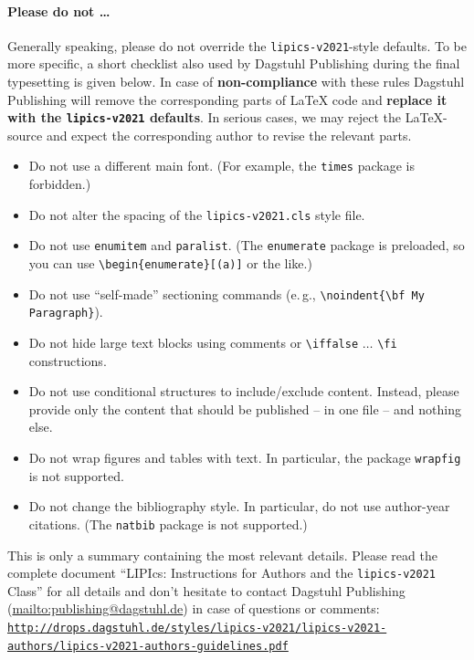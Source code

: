 \paragraph*{Please do not \ldots} %
Generally speaking, please do not override the \texttt{lipics-v2021}-style defaults. To be more specific, a short checklist also used by Dagstuhl Publishing during the final typesetting is given below.
In case of \textbf{non-compliance} with these rules Dagstuhl Publishing will remove the corresponding parts of \LaTeX{} code and \textbf{replace it with the \texttt{lipics-v2021} defaults}. In serious cases, we may reject the LaTeX-source and expect the corresponding author to revise the relevant parts.
\begin{itemize}
\item Do not use a different main font. (For example, the \texttt{times} package is forbidden.)
\item Do not alter the spacing of the \texttt{lipics-v2021.cls} style file.
\item Do not use \verb+enumitem+ and \verb+paralist+. (The \texttt{enumerate} package is preloaded, so you can use
 \verb+\begin{enumerate}[(a)]+ or the like.)
\item Do not use ``self-made'' sectioning commands (e.\,g., \verb+\noindent{\bf My+ \verb+Paragraph}+).
\item Do not hide large text blocks using comments or \verb+\iffalse+ $\ldots$ \verb+\fi+ constructions. 
\item Do not use conditional structures to include/exclude content. Instead, please provide only the content that should be published -- in one file -- and nothing else.
\item Do not wrap figures and tables with text. In particular, the package \texttt{wrapfig} is not supported.
\item Do not change the bibliography style. In particular, do not use author-year citations. (The
\texttt{natbib} package is not supported.)
\end{itemize}

\enlargethispage{\baselineskip}

This is only a summary containing the most relevant details. Please read the complete document ``LIPIcs: Instructions for Authors and the \texttt{lipics-v2021} Class'' for all details and don't hesitate to contact Dagstuhl Publishing (\url{mailto:publishing@dagstuhl.de}) in case of questions or comments:
\href{http://drops.dagstuhl.de/styles/lipics-v2021/lipics-v2021-authors/lipics-v2021-authors-guidelines.pdf}{\texttt{http://drops.dagstuhl.de/styles/lipics-v2021/\newline lipics-v2021-authors/lipics-v2021-authors-guidelines.pdf}}

